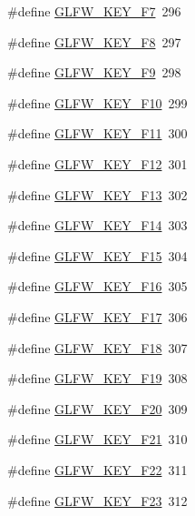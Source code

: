 \begin{DoxyCompactItemize}
\item 
\#define \hyperlink{group__keys_gacca6ef8a2162c52a0ac1d881e8d9c38a}{G\-L\-F\-W\-\_\-\-K\-E\-Y\-\_\-\-F7}~296
\item 
\#define \hyperlink{group__keys_gac9d39390336ae14e4a93e295de43c7e8}{G\-L\-F\-W\-\_\-\-K\-E\-Y\-\_\-\-F8}~297
\item 
\#define \hyperlink{group__keys_gae40de0de1c9f21cd26c9afa3d7050851}{G\-L\-F\-W\-\_\-\-K\-E\-Y\-\_\-\-F9}~298
\item 
\#define \hyperlink{group__keys_ga718d11d2f7d57471a2f6a894235995b1}{G\-L\-F\-W\-\_\-\-K\-E\-Y\-\_\-\-F10}~299
\item 
\#define \hyperlink{group__keys_ga0bc04b11627e7d69339151e7306b2832}{G\-L\-F\-W\-\_\-\-K\-E\-Y\-\_\-\-F11}~300
\item 
\#define \hyperlink{group__keys_gaf5908fa9b0a906ae03fc2c61ac7aa3e2}{G\-L\-F\-W\-\_\-\-K\-E\-Y\-\_\-\-F12}~301
\item 
\#define \hyperlink{group__keys_gad637f4308655e1001bd6ad942bc0fd4b}{G\-L\-F\-W\-\_\-\-K\-E\-Y\-\_\-\-F13}~302
\item 
\#define \hyperlink{group__keys_gaf14c66cff3396e5bd46e803c035e6c1f}{G\-L\-F\-W\-\_\-\-K\-E\-Y\-\_\-\-F14}~303
\item 
\#define \hyperlink{group__keys_ga7f70970db6e8be1794da8516a6d14058}{G\-L\-F\-W\-\_\-\-K\-E\-Y\-\_\-\-F15}~304
\item 
\#define \hyperlink{group__keys_gaa582dbb1d2ba2050aa1dca0838095b27}{G\-L\-F\-W\-\_\-\-K\-E\-Y\-\_\-\-F16}~305
\item 
\#define \hyperlink{group__keys_ga972ce5c365e2394b36104b0e3125c748}{G\-L\-F\-W\-\_\-\-K\-E\-Y\-\_\-\-F17}~306
\item 
\#define \hyperlink{group__keys_gaebf6391058d5566601e357edc5ea737c}{G\-L\-F\-W\-\_\-\-K\-E\-Y\-\_\-\-F18}~307
\item 
\#define \hyperlink{group__keys_gaec011d9ba044058cb54529da710e9791}{G\-L\-F\-W\-\_\-\-K\-E\-Y\-\_\-\-F19}~308
\item 
\#define \hyperlink{group__keys_ga82b9c721ada04cd5ca8de767da38022f}{G\-L\-F\-W\-\_\-\-K\-E\-Y\-\_\-\-F20}~309
\item 
\#define \hyperlink{group__keys_ga356afb14d3440ff2bb378f74f7ebc60f}{G\-L\-F\-W\-\_\-\-K\-E\-Y\-\_\-\-F21}~310
\item 
\#define \hyperlink{group__keys_ga90960bd2a155f2b09675324d3dff1565}{G\-L\-F\-W\-\_\-\-K\-E\-Y\-\_\-\-F22}~311
\item 
\#define \hyperlink{group__keys_ga43c21099aac10952d1be909a8ddee4d5}{G\-L\-F\-W\-\_\-\-K\-E\-Y\-\_\-\-F23}~312

\end{DoxyCompactItemize}
